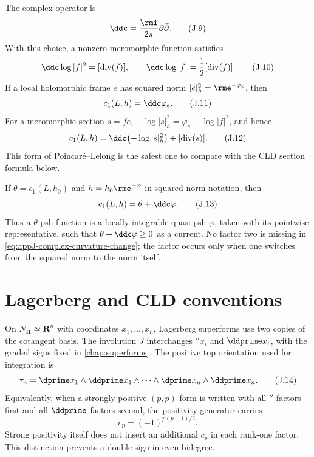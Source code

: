 The complex operator is
\begin{equation*}
 \ddc=\frac{\rmi}{2\pi}\partial\bar\partial.
 \tag{J.9}\label{eq:appJ-ddc}
\end{equation*}
With this choice, a nonzero meromorphic function satisfies
\begin{equation*}
 \ddc\log|f|^2=[\operatorname{div}(f)],
 \qquad
 \ddc\log|f|=\frac12[\operatorname{div}(f)].
 \tag{J.10}\label{eq:appJ-complex-pl}
\end{equation*}
If a local holomorphic frame \(e\) has squared norm
\(|e|_h^2=\rme^{-\varphi_e}\), then
\begin{equation*}
 c_1(L,h)=\ddc\varphi_e.
 \tag{J.11}\label{eq:appJ-complex-c1}
\end{equation*}
For a meromorphic section \(s=fe\),
\(-\log|s|_h^2=\varphi_e-\log|f|^2\), and hence
\begin{equation*}
 c_1(L,h)=\ddc\bigl(-\log|s|_h^2\bigr)
              +[\operatorname{div}(s)].
 \tag{J.12}\label{eq:appJ-complex-section-pl}
\end{equation*}
This form of Poincar\'e--Lelong is the safest one to compare with the CLD
section formula below.

If \(\theta=c_1(L,h_0)\) and \(h=h_0\rme^{-\varphi}\) in squared-norm
notation, then
\begin{equation*}
 c_1(L,h)=\theta+\ddc\varphi.
 \tag{J.13}\label{eq:appJ-complex-curvature-change}
\end{equation*}
Thus a \(\theta\)-psh function is a locally integrable quasi-psh
\(\varphi\), taken with its pointwise representative, such that
\(\theta+\ddc\varphi\geq0\) as a current. No factor two is missing in
\eqref{eq:appJ-complex-curvature-change}; the factor occurs only when one
switches from the squared norm to the norm itself.

\section{Lagerberg and CLD conventions}
\label{sec:appJ-cld}

On \(N_{\mathbf R}\simeq\mathbf R^n\) with coordinates \(x_1,\dots,x_n\),
Lagerberg superforms use two copies of the cotangent basis.  The involution
\(J\) interchanges \(\dprime x_i\) and \(\ddprime x_i\), with the graded
signs fixed in \cref{chap:superforms}.  The positive top orientation used for integration
is
\begin{equation*}
 \tau_n=
 \dprime x_1\wedge\ddprime x_1\wedge\cdots\wedge
 \dprime x_n\wedge\ddprime x_n.
 \tag{J.14}\label{eq:appJ-lagerberg-orientation}
\end{equation*}
Equivalently, when a strongly positive \((p,p)\)-form is written with all
\(\dprime\)-factors first and all \(\ddprime\)-factors second, the positivity
generator carries
\begin{equation*}
 c_p=(-1)^{p(p-1)/2}.
 \tag{J.15}\label{eq:appJ-cp}
\end{equation*}
Strong positivity itself does not insert an additional \(c_p\) in each
rank-one factor.  This distinction prevents a double sign in even bidegree.

